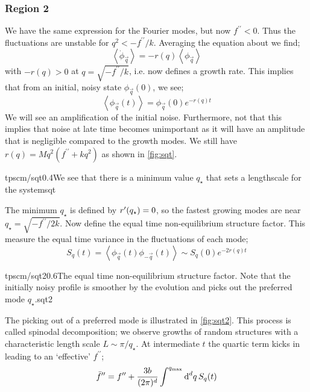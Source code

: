 \subsubsection*{Region 2}
We have the same expression for the Fourier modes, but now $f^{\prime\prime} < 0$. Thus the fluctuations are unstable for $q^2 < -f^{\prime\prime}/k$. Averaging the equation about we find;
\begin{equation*}
\left< \dot{\phi}_{\vec{q}} \right> = -r(q)\left< \phi_{\vec{q}} \right>
\end{equation*}
with $-r(q) > 0$ at $q = \sqrt{-f^{\prime\prime}/k}$, i.e. now defines a growth rate. This implies that from an initial, noisy state $\phi_{\vec{q}}(0)$, we see;
\begin{equation*}
\left< \phi_{\vec{q}}(t) \right> = \phi_{\vec{q}}(0)e^{-r(q)t}
\end{equation*}
We will see an amplification of the initial noise. Furthermore, not that this implies that noise at late time becomes unimportant as it will have an amplitude that is negligible compared to the growth modes. We still have $r(q) = Mq^2(f^{\prime\prime} + kq^2)$ as shown in \autoref{fig:sqt}. 
\begin{mygraphic}{tpscm/sqt}{0.4}{We see that there is a minimum value $q_{\star}$ that sets a lengthscale for the system}{sqt}\end{mygraphic}
The minimum $q_{\star}$ is defined by $r^{\prime}(q_{\star}) = 0$, so the fastest growing modes are near $q_{\star} = \sqrt{-f^{\prime\prime}/2k}$. Now define the equal time non-equilibrium structure factor. This measure the equal time variance in the fluctuations of each mode;
\begin{equation}
S_q(t) = \left< \phi_{\vec{q}}(t)\phi_{-\vec{q}}(t) \right> \sim S_q(0)e^{-2r(q)t}
\end{equation}
\begin{mygraphic}{tpscm/sqt2}{0.6}{The equal time non-equilibrium structure factor. Note that the initially noisy profile is smoother by the evolution and picks out the preferred mode $q_{\star}$.}{sqt2}\end{mygraphic}
The picking out of a preferred mode is illustrated in \autoref{fig:sqt2}. This process is called spinodal decomposition; we observe growths of random structures with a characteristic length scale $L \sim \pi/q_{\star}$. At intermediate $t$ the quartic term kicks in leading to an `effective' $f^{\prime\prime}$;
\begin{equation*}
\bar{f}^{\prime\prime} = f^{\prime\prime} + \frac{3b}{(2\pi)^d}\int^{q_{\text{max}}}{\text{d}^d q \,S_{q}(t)}
\end{equation*}
